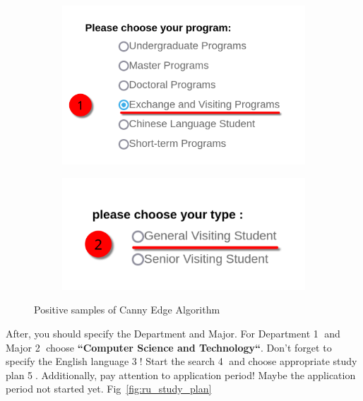 \begin{figure}[htbp]
    \centering
    \begin{subfigure}[c]{0.49\textwidth}
        \centering
        \includegraphics[width=\textwidth]{russia/imgs/app_1}
    \end{subfigure}
    \hfill
    \begin{subfigure}[c]{0.49\textwidth}
        \centering
        \includegraphics[width=\textwidth]{russia/imgs/app_2}
    \end{subfigure}
    \caption{Positive samples of Canny Edge Algorithm}
    \label{fig:ru_student_type}
\end{figure}



After, you should specify the Department and Major.
For Department \textcircled{1} and Major \textcircled{2} choose
\textbf{``Computer Science and Technology``}.
Don't forget to specify the English language \textcircled{3}!
Start the search \textcircled{4} and choose appropriate study plan \textcircled{5}.
Additionally, pay attention to application period!
Maybe the application period not started yet.
Fig~\ref{fig:ru_study_plan}


